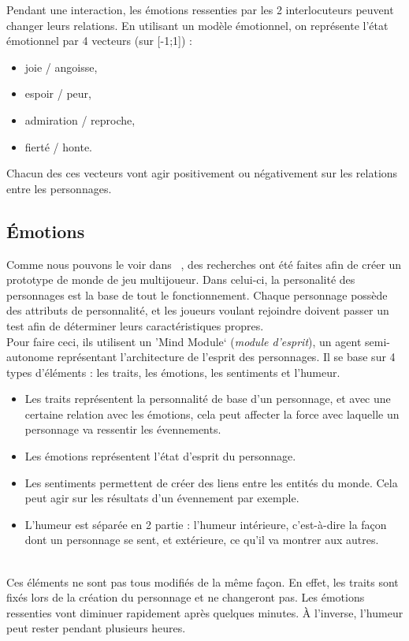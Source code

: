 \documentclass[asi]{picINSA}
\begin{document}
Pendant une interaction, les émotions ressenties par les 2 interlocuteurs peuvent changer leurs relations. En utilisant un modèle émotionnel, on représente l'état émotionnel par 4 vecteurs (sur [-1;1]) :
\begin{itemize}
\item joie / angoisse,
\item espoir / peur,
\item admiration / reproche,
\item fierté / honte.
\end{itemize}
Chacun des ces vecteurs vont agir positivement ou négativement sur les relations entre les personnages.

\subsection{Émotions}

Comme nous pouvons le voir dans ~\cite{IRIS:conf/aiide/Eladhari2010}, des recherches ont été faites afin de créer un prototype de monde de jeu multijoueur. Dans celui-ci, la personalité des personnages est la base de tout le fonctionnement. Chaque personnage possède des attributs de personnalité, et les joueurs voulant rejoindre doivent passer un test afin de déterminer leurs caractéristiques propres.\\

Pour faire ceci, ils utilisent un \rq{}Mind Module\lq{} (\textit{module d'esprit}), un agent semi-autonome représentant l'architecture de l'esprit des personnages. Il se base sur 4 types d'éléments : les traits, les émotions, les sentiments et l'humeur.\\
\begin{itemize}
\item Les traits représentent la personnalité de base d'un personnage, et avec une certaine relation avec les émotions, cela peut affecter la force avec laquelle un personnage va ressentir les évennements.
\item Les émotions représentent l'état d'esprit du personnage.
\item Les sentiments permettent de créer des liens entre les entités du monde. Cela peut agir sur les résultats d'un évennement par exemple.
\item L'humeur est séparée en 2 partie : l'humeur intérieure, c'est-à-dire la façon dont un personnage se sent, et extérieure, ce qu'il va montrer aux autres.
\end{itemize}
~\\
Ces éléments ne sont pas tous modifiés de la même façon. En effet, les traits sont fixés lors de la création du personnage et ne changeront pas. Les émotions ressenties vont diminuer rapidement après quelques minutes. À l'inverse, l'humeur peut rester pendant plusieurs heures.
\end{document}
